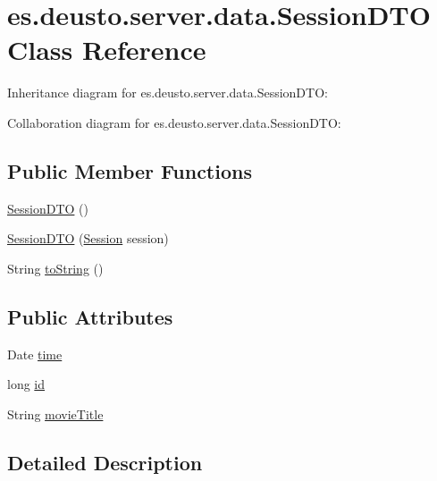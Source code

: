 \hypertarget{classes_1_1deusto_1_1server_1_1data_1_1_session_d_t_o}{}\section{es.\+deusto.\+server.\+data.\+Session\+D\+TO Class Reference}
\label{classes_1_1deusto_1_1server_1_1data_1_1_session_d_t_o}


Inheritance diagram for es.\+deusto.\+server.\+data.\+Session\+D\+TO\+:


Collaboration diagram for es.\+deusto.\+server.\+data.\+Session\+D\+TO\+:
\subsection*{Public Member Functions}
\begin{DoxyCompactItemize}
\item 
\mbox{\hyperlink{classes_1_1deusto_1_1server_1_1data_1_1_session_d_t_o_a6bd48894fa99ffb816184e90a5a1fddc}{Session\+D\+TO}} ()
\item 
\mbox{\hyperlink{classes_1_1deusto_1_1server_1_1data_1_1_session_d_t_o_a8bdfa9095064ac9b72508b348302c852}{Session\+D\+TO}} (\mbox{\hyperlink{classes_1_1deusto_1_1server_1_1jdo_1_1_session}{Session}} session)
\item 
String \mbox{\hyperlink{classes_1_1deusto_1_1server_1_1data_1_1_session_d_t_o_a06afcafbaf96e02138b05c22aa66f9bc}{to\+String}} ()
\end{DoxyCompactItemize}
\subsection*{Public Attributes}
\begin{DoxyCompactItemize}
\item 
Date \mbox{\hyperlink{classes_1_1deusto_1_1server_1_1data_1_1_session_d_t_o_a38cf2d216aa3498c72da81c0f97ae3a0}{time}}
\item 
long \mbox{\hyperlink{classes_1_1deusto_1_1server_1_1data_1_1_session_d_t_o_a382bdd28e4dcfa064fe7fc50f85a732b}{id}}
\item 
String \mbox{\hyperlink{classes_1_1deusto_1_1server_1_1data_1_1_session_d_t_o_ab6b2608b4e2183f18defa70929e9c056}{movie\+Title}}
\end{DoxyCompactItemize}


\subsection{Detailed Description}


